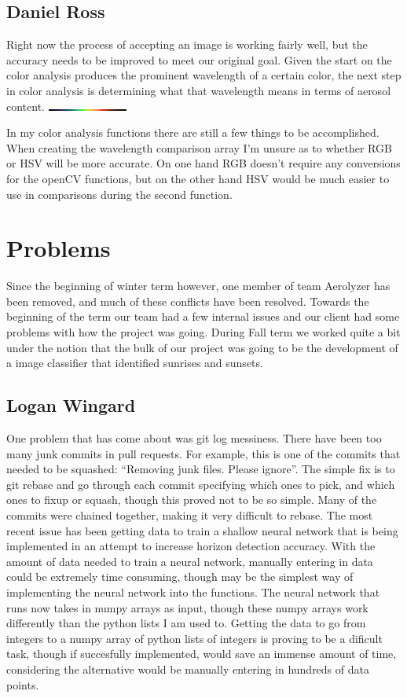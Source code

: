\documentclass[onecolumn, draftclsnofoot,10pt, compsoc]{IEEEtran}
\begin{document}
\begin{singlespace}
		\subsection{Daniel Ross}
			Right now the process of accepting an image is working fairly well, but the accuracy needs to be improved to meet our original goal.
			Given the start on the color analysis produces the prominent wavelength of a certain color, the next step in color analysis is determining what that wavelength means in terms of aerosol content.
			\includegraphics[height=0.05cm,natwidth=370,natheight=7]{images/Visible_Color_Spectrum.png}
			
			In my color analysis functions there are still a few things to be accomplished.
			When creating the wavelength comparison array I'm unsure as to whether RGB or HSV will be more accurate.
			On one hand RGB doesn't require any conversions for the openCV functions, but on the other hand HSV would be much easier to use in comparisons during the second function.


	\section{Problems}
		Since the beginning of winter term however, one member of team Aerolyzer has been removed, and much of these conflicts have been resolved.
		Towards the beginning of the term our team had a few internal issues and our client had some problems with how the project was going.
		During Fall term we worked quite a bit under the notion that the bulk of our project was going to be the development of a image classifier that identified sunrises and sunsets.
		\subsection{Logan Wingard}
			One problem that has come about was git log messiness.
			There have been too many junk commits in pull requests. 
			For example, this is one of the commits that needed to be squashed: ``Removing junk files. Please ignore''.
			The simple fix is to git rebase and go through each commit specifying which ones to pick, and which ones to fixup or squash, though this proved not to be so simple.
			Many of the commits were chained together, making it very difficult to rebase.
			The most recent issue has been getting data to train a shallow neural network that is being implemented in an attempt to increase horizon detection accuracy.
			With the amount of data needed to train a neural network, manually entering in data could be extremely time consuming, though may be the simplest way of implementing the neural network into the functions.
			The neural network that runs now takes in numpy arrays as input, though these numpy arrays work differently than the python lists I am used to. 
			Getting the data to go from integers to a numpy array of python lists of integers is proving to be a dificult task, though if succesfully implemented, would save an immense amount of time, considering the alternative would be manually entering in hundreds of data points.

\end{singlespace}
\end{document}

